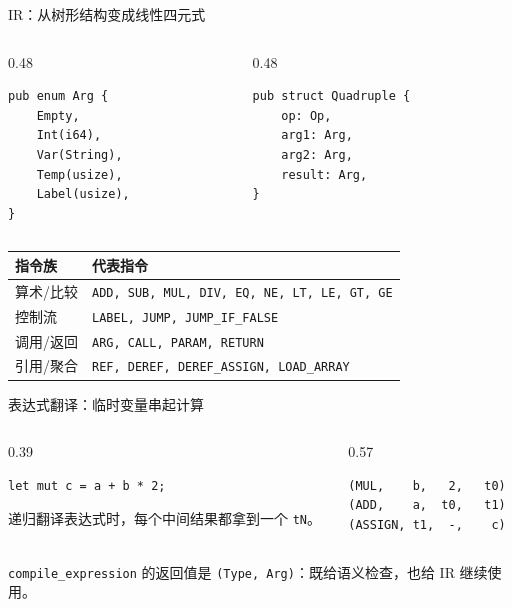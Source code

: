 \documentclass[aspectratio=169]{ctexbeamer}
\begin{document}
\begin{frame}[fragile]{IR：从树形结构变成线性四元式}
    \begin{columns}[T]
    \begin{column}{0.48\textwidth}
        \begin{lstlisting}[style=tinycode]
pub enum Arg {
    Empty,
    Int(i64),
    Var(String),
    Temp(usize),
    Label(usize),
}
        \end{lstlisting}
    \end{column}
    \begin{column}{0.48\textwidth}
        \begin{lstlisting}[style=tinycode]
pub struct Quadruple {
    op: Op,
    arg1: Arg,
    arg2: Arg,
    result: Arg,
}
        \end{lstlisting}
    \end{column}
    \end{columns}
    \begin{table}
    \centering
    \scriptsize
    \begin{tabular}{p{2.5cm}p{7.8cm}}
        \toprule
        \textbf{指令族} & \textbf{代表指令} \\
        \midrule
        算术/比较 & \texttt{ADD, SUB, MUL, DIV, EQ, NE, LT, LE, GT, GE} \\
        控制流 & \texttt{LABEL, JUMP, JUMP\_IF\_FALSE} \\
        调用/返回 & \texttt{ARG, CALL, PARAM, RETURN} \\
        引用/聚合 & \texttt{REF, DEREF, DEREF\_ASSIGN, LOAD\_ARRAY} \\
        \bottomrule
    \end{tabular}
    \end{table}
\end{frame}

\begin{frame}[fragile]{表达式翻译：临时变量串起计算}
    \begin{columns}[T]
    \begin{column}{0.39\textwidth}
        \begin{lstlisting}[style=code]
let mut c = a + b * 2;
        \end{lstlisting}
        \vspace{0.4em}
        \small
        递归翻译表达式时，每个中间结果都拿到一个 \texttt{tN}。
    \end{column}
    \begin{column}{0.57\textwidth}
        \begin{lstlisting}[style=code]
(MUL,    b,   2,   t0)
(ADD,    a,  t0,   t1)
(ASSIGN, t1,  -,    c)
        \end{lstlisting}
    \end{column}
    \end{columns}
    \vspace{0.3em}
    \centering
    \texttt{compile\_expression} 的返回值是 \texttt{(Type, Arg)}：既给语义检查，也给 IR 继续使用。
\end{frame}
\end{document}
